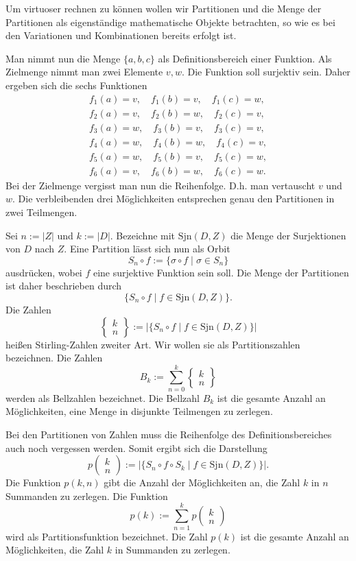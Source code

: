 \documentclass[a4paper,12pt,fleqn]{article}
\begin{document}
Um virtuoser rechnen zu können wollen wir Partitionen und die
Menge der Partitionen als eigenständige mathematische
Objekte betrachten, so wie es bei den Variationen und Kombinationen
bereits erfolgt ist.

Man nimmt nun die Menge $\{a,b,c\}$ als Definitionsbereich einer
Funktion. Als Zielmenge nimmt man zwei Elemente $v,w$.
Die Funktion soll surjektiv sein. Daher ergeben sich die
sechs Funktionen
\begin{gather*}
f_1(a)=v,\quad f_1(b)=v,\quad f_1(c)=w,\\
f_2(a)=v,\quad f_2(b)=w,\quad f_2(c)=v,\\
f_3(a)=w,\quad f_3(b)=v,\quad f_3(c)=v,\\
f_4(a)=w,\quad f_4(b)=w,\quad f_4(c)=v,\\
f_5(a)=w,\quad f_5(b)=v,\quad f_5(c)=w,\\
f_6(a)=v,\quad f_6(b)=w,\quad f_6(c)=w.
\end{gather*}
Bei der Zielmenge vergisst man nun die Reihenfolge. D.h. man
vertauscht $v$ und $w$. Die verbleibenden drei Möglichkeiten
entsprechen genau den Partitionen in zwei Teilmengen.

Sei $n:=|Z|$ und $k:=|D|$. Bezeichne mit $\mathrm{Sjn}(D,Z)$
die Menge der Surjektionen von $D$ nach $Z$. Eine Partition
lässt sich nun als Orbit
\[S_n\circ f := \{\sigma\circ f\;|\;\sigma\in S_n\}\]
ausdrücken, wobei $f$ eine surjektive Funktion sein soll. 
Die Menge der Partitionen ist daher beschrieben durch
\[\{S_n\circ f\;|\;f\in\mathrm{Sjn}(D,Z)\}.\]
Die Zahlen
\[\begin{Bmatrix}
k\\ n
\end{Bmatrix}
:=|\{S_n\circ f\;|\;f\in\mathrm{Sjn}(D,Z)\}|\]
heißen Stirling-Zahlen zweiter Art. Wir wollen sie
als Partitionszahlen bezeichnen. Die Zahlen
\[B_k:=\sum_{n=0}^k \begin{Bmatrix}
k\\ n
\end{Bmatrix}\]
werden als Bellzahlen bezeichnet. Die Bellzahl $B_k$ ist
die gesamte Anzahl an Möglichkeiten, eine Menge in disjunkte
Teilmengen zu zerlegen. 

Bei den Partitionen von Zahlen muss die Reihenfolge des
Definitionsbereiches auch noch vergessen werden. Somit ergibt
sich die Darstellung
\[p\begin{pmatrix}k\\ n\end{pmatrix}
:=|\{S_n\circ f\circ S_k\;|\; f\in\mathrm{Sjn}(D,Z)\}|.\]
Die Funktion $p(k,n)$ gibt die Anzahl der Möglichkeiten an, die
Zahl $k$ in $n$ Summanden zu zerlegen. Die Funktion
\[p(k) := \sum_{n=1}^k p\begin{pmatrix}
k\\ n
\end{pmatrix}\]
wird als Partitionsfunktion bezeichnet. Die Zahl $p(k)$ ist
die gesamte Anzahl an Möglichkeiten, die Zahl $k$ in Summanden
zu zerlegen.
\end{document}
